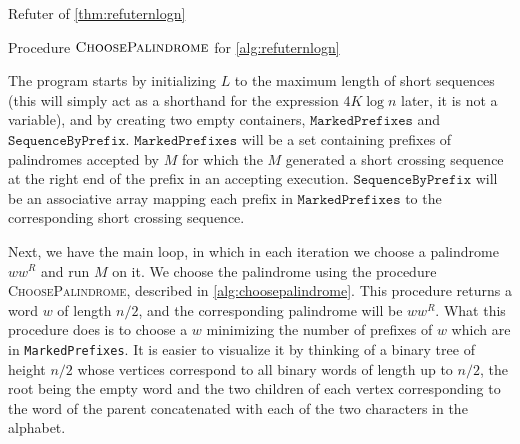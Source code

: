 \begin{algorithm}
    \caption{Refuter of \cref{thm:refuternlogn}}\label{alg:refuternlogn}
    \begin{algorithmic}
    
    \end{algorithmic}
\end{algorithm}
\begin{algorithm}
    \caption{Procedure $\textsc{ChoosePalindrome}$ for \cref{alg:refuternlogn}}\label{alg:choosepalindrome}
    \begin{algorithmic}
    
    \end{algorithmic}
\end{algorithm}


The program starts by initializing $L$ to the maximum length of short sequences (this will simply act as a shorthand
for the expression $4K \log n$ later, it is not a variable), and by creating two empty containers, 
$\texttt{MarkedPrefixes}$ and $\texttt{SequenceByPrefix}$. $\texttt{MarkedPrefixes}$ will be a set
containing prefixes of palindromes accepted by $M$ for which the $M$ generated a short crossing
sequence at the right end of the prefix in an accepting execution. $\texttt{SequenceByPrefix}$ will be
an associative array mapping each prefix in $\texttt{MarkedPrefixes}$ to the corresponding 
short crossing sequence.

Next, we have the main loop, in which in each iteration we choose a palindrome $ww^R$ and run $M$ on it.  
We choose the palindrome using the procedure \textsc{ChoosePalindrome}, described in \cref{alg:choosepalindrome}. 
This procedure returns a word $w$ of length $n/2$, and the corresponding palindrome will be $ww^R$. 
What this procedure does is to choose a $w$ minimizing the number of prefixes of $w$ which are
in \texttt{MarkedPrefixes}. It is easier to visualize it by thinking of a binary tree of height $n/2$ whose
vertices correspond to all binary words of length up to $n/2$, the root being the empty word and the two children
of each vertex corresponding to the word of the parent concatenated with each of the two characters in the alphabet.

\begin{figure}
\end{figure}

